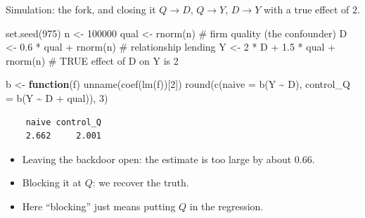 \documentclass[
  11pt,
  ignorenonframetext,
  aspectratio=169,
]{beamer}
\newenvironment{Shaded}{\begin{snugshade}}{\end{snugshade}}
\newcommand{\AttributeTok}[1]{\textcolor[rgb]{0.40,0.45,0.13}{#1}}
\newcommand{\CommentTok}[1]{\textcolor[rgb]{0.37,0.37,0.37}{#1}}
\newcommand{\ControlFlowTok}[1]{\textcolor[rgb]{0.00,0.23,0.31}{\textbf{#1}}}
\newcommand{\DecValTok}[1]{\textcolor[rgb]{0.68,0.00,0.00}{#1}}
\newcommand{\FloatTok}[1]{\textcolor[rgb]{0.68,0.00,0.00}{#1}}
\newcommand{\FunctionTok}[1]{\textcolor[rgb]{0.28,0.35,0.67}{#1}}
\newcommand{\NormalTok}[1]{\textcolor[rgb]{0.00,0.23,0.31}{#1}}
\newcommand{\OtherTok}[1]{\textcolor[rgb]{0.00,0.23,0.31}{#1}}
\newcommand{\SpecialCharTok}[1]{\textcolor[rgb]{0.37,0.37,0.37}{#1}}
\providecommand{\tightlist}{%
  \setlength{\itemsep}{0pt}\setlength{\parskip}{0pt}}
\begin{document}
\begin{frame}[fragile]{Simulation: the fork, and closing it}
\protect{}\label{simulation-the-fork-and-closing-it}
\(Q \to D\), \(Q \to Y\), \(D \to Y\) with a true effect of \(2\).

\begin{Shaded}
\begin{Highlighting}[]
\FunctionTok{set.seed}\NormalTok{(}\DecValTok{975}\NormalTok{)}
\NormalTok{n    }\OtherTok{\textless{}{-}} \DecValTok{100000}
\NormalTok{qual }\OtherTok{\textless{}{-}} \FunctionTok{rnorm}\NormalTok{(n)                    }\CommentTok{\# firm quality (the confounder)}
\NormalTok{D    }\OtherTok{\textless{}{-}} \FloatTok{0.6} \SpecialCharTok{*}\NormalTok{ qual }\SpecialCharTok{+} \FunctionTok{rnorm}\NormalTok{(n)       }\CommentTok{\# relationship lending}
\NormalTok{Y    }\OtherTok{\textless{}{-}} \DecValTok{2} \SpecialCharTok{*}\NormalTok{ D }\SpecialCharTok{+} \FloatTok{1.5} \SpecialCharTok{*}\NormalTok{ qual }\SpecialCharTok{+} \FunctionTok{rnorm}\NormalTok{(n)   }\CommentTok{\# TRUE effect of D on Y is 2}

\NormalTok{b }\OtherTok{\textless{}{-}} \ControlFlowTok{function}\NormalTok{(f) }\FunctionTok{unname}\NormalTok{(}\FunctionTok{coef}\NormalTok{(}\FunctionTok{lm}\NormalTok{(f))[}\DecValTok{2}\NormalTok{])}
\FunctionTok{round}\NormalTok{(}\FunctionTok{c}\NormalTok{(}\AttributeTok{naive =} \FunctionTok{b}\NormalTok{(Y }\SpecialCharTok{\textasciitilde{}}\NormalTok{ D), }\AttributeTok{control\_Q =} \FunctionTok{b}\NormalTok{(Y }\SpecialCharTok{\textasciitilde{}}\NormalTok{ D }\SpecialCharTok{+}\NormalTok{ qual)), }\DecValTok{3}\NormalTok{)}
\end{Highlighting}
\end{Shaded}

\begin{verbatim}
    naive control_Q 
    2.662     2.001 
\end{verbatim}

\begin{itemize}
\tightlist
\item
  Leaving the backdoor open: the estimate is too large by about
  \(0.66\).
\item
  Blocking it at \(Q\): we recover the truth.
\item
  Here ``blocking'' just means putting \(Q\) in the regression.
\end{itemize}
\end{frame}
\end{document}
